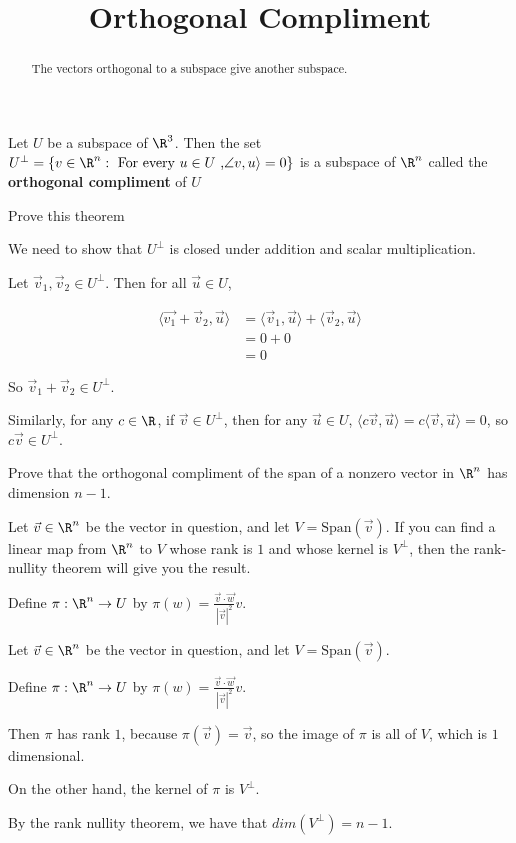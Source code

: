 \documentclass{ximera}
\title{Orthogonal Compliment}
\begin{document}
\begin{abstract}
	The vectors orthogonal to a subspace give another subspace.
\end{abstract}\maketitle

\begin{theorem}
	Let $U$ be a subspace of $\R^3$.  Then the set $U^\perp = \{ v \in \R^n: \text{ For every \(u \in U\) ,} \angle v ,u\rangle = 0\}$ is a subspace of $\R^n$ 
	called the \textbf{orthogonal compliment} of $U$
\end{theorem}

Prove this theorem

\begin{free-response}
	We need to show that $U^\perp$ is closed under addition and scalar multiplication.
	
	Let $\vec{v}_1,\vec{v}_2 \in U^\perp$.  Then for all $\vec{u} \in U$,
	
	\begin{align*}
		\langle \vec{v_1}+\vec{v}_2, \vec{u} \rangle &= \langle \vec{v}_1, \vec{u}\rangle + \langle \vec{v}_2,\vec{u}\rangle\\
		&= 0+0\\
		&=0
	\end{align*}
	
	So $\vec{v}_1+\vec{v}_2 \in U^\perp$.
	
	Similarly, for any $c \in \R$, if $\vec{v} \in U^\perp$, then for any $\vec{u} \in U$, $\langle c\vec{v}, \vec{u} \rangle = c\langle \vec{v},\vec{u} \rangle = 0$, so 
	$c\vec{v} \in U^\perp$.
\end{free-response}

Prove that the orthogonal compliment of the span of a nonzero vector in $\R^n$ has dimension $n-1$.

\begin{hint}
	Let $\vec{v} \in \R^n$ be the vector in question, and let $V = \textrm{Span}(\vec{v})$.
	  If you can find a linear map from $\R^n$ to $V$ whose rank is $1$ and whose kernel is $V^\perp$, then the rank-nullity theorem will give you the result.
\end{hint}

\begin{hint}
	Define $\pi:\R^n \to U$ by $\pi(w) = \frac{\vec{v} \cdot \vec{w}}{|\vec{v}|^2} v$.
\end{hint}
\begin{free-response}
Let $\vec{v} \in \R^n$ be the vector in question, and let $V = \textrm{Span}(\vec{v})$.

Define $\pi:\R^n \to U$ by $\pi(w) = \frac{\vec{v} \cdot \vec{w}}{|\vec{v}|^2} v$.

Then $\pi$ has rank $1$, because $\pi(\vec{v}) = \vec{v}$, so the image of $\pi$ is all of $V$, which is $1$ dimensional.

On the other hand, the kernel of $\pi$ is $V^\perp$.

By the rank nullity theorem, we have that $dim(V^\perp) = n-1$.
\end{free-response}
\end{document}
